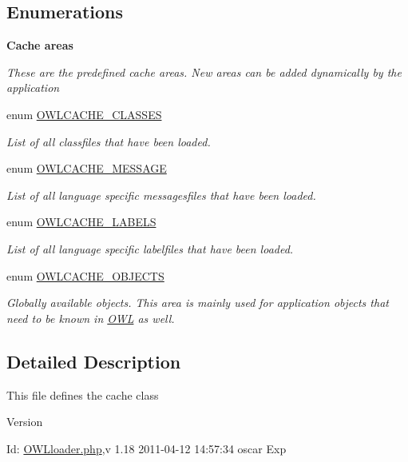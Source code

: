 \subsection*{Enumerations}
\begin{Indent}{\bf Cache areas}\par
{\em \label{_amgrp8f709ce9e95fb7a49832c92aa7730a5b}
 These are the predefined cache areas. New areas can be added dynamically by the application }\begin{DoxyCompactItemize}
\item 
enum \hyperlink{class_8cache_8php_abb193d72fe0ccf2933265e1a4ed44871}{OWLCACHE\_\-CLASSES} 
\begin{DoxyCompactList}\small\item\em List of all classfiles that have been loaded. \item\end{DoxyCompactList}\item 
enum \hyperlink{class_8cache_8php_ae55be4307f9104de754eb3da6d94ee17}{OWLCACHE\_\-MESSAGE} 
\begin{DoxyCompactList}\small\item\em List of all language specific messagesfiles that have been loaded. \item\end{DoxyCompactList}\item 
enum \hyperlink{class_8cache_8php_ad4a4a5cbb5f8ee148e301224fdc229f2}{OWLCACHE\_\-LABELS} 
\begin{DoxyCompactList}\small\item\em List of all language specific labelfiles that have been loaded. \item\end{DoxyCompactList}\item 
enum \hyperlink{class_8cache_8php_a071ce1f57cd4c167c013a8ad61ed1456}{OWLCACHE\_\-OBJECTS} 
\begin{DoxyCompactList}\small\item\em Globally available objects. This area is mainly used for application objects that need to be known in \hyperlink{classOWL}{OWL} as well. \item\end{DoxyCompactList}\end{DoxyCompactItemize}
\end{Indent}


\subsection{Detailed Description}
This file defines the cache class \begin{DoxyVersion}{Version}

\end{DoxyVersion}
\begin{DoxyParagraph}{Id:}
\hyperlink{OWLloader_8php}{OWLloader.php},v 1.18 2011-\/04-\/12 14:57:34 oscar Exp 
\end{DoxyParagraph}


